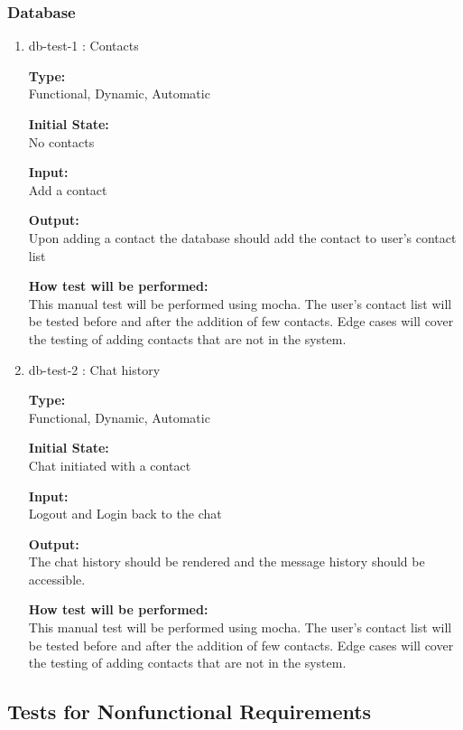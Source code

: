\documentclass[12pt, titlepage]{article}
\begin{document}
\subsubsection{Database}
\begin{enumerate}
\item{db-test-1 : Contacts\\}

\textbf{Type:}\\ Functional, Dynamic, Automatic
					
\textbf{Initial State:}\\ No contacts
					
\textbf{Input:}\\ Add a contact
					
\textbf{Output:}\\ Upon adding a contact the database should add the contact to user's contact list
					
\textbf{How test will be performed:}\\ 
This manual test will be performed using mocha. The user's contact list will be tested before and after the addition of few contacts. Edge cases will cover the testing of adding contacts that are not in the system.

\item{db-test-2 : Chat history\\}

\textbf{Type:}\\ Functional, Dynamic, Automatic
					
\textbf{Initial State:}\\ Chat initiated with a contact
					
\textbf{Input:}\\ Logout and Login back to the chat
					
\textbf{Output:}\\ The chat history should be rendered and the message history should be accessible.
					
\textbf{How test will be performed:}\\ 
This manual test will be performed using mocha. The user's contact list will be tested before and after the addition of few contacts. Edge cases will cover the testing of adding contacts that are not in the system.
\end{enumerate}

\subsection{Tests for Nonfunctional Requirements}
\end{document}
